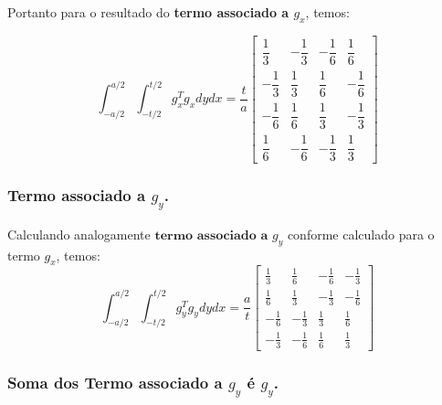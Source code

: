 \documentclass[
12pt,
a4paper,
oneside,
chapter=TITLE,
sumario=tradicional
]{abntex2}
\begin{document}
Portanto para o resultado do \textbf{termo associado a $g_x$}, temos:

\begin{equation}
	\int_{-a/2}^{a/2} \int_{-t/2}^{t/2} g_x^T g_x  dy dx
	=
	\frac{t}{a}  
	\begin{bmatrix}  
		\dfrac{1}{3} & -\dfrac{1}{3} & -\dfrac{1}{6} & \dfrac{1}{6} \\  
		-\dfrac{1}{3} & \dfrac{1}{3} & \dfrac{1}{6} & -\dfrac{1}{6} \\  
		-\dfrac{1}{6} & \dfrac{1}{6} & \dfrac{1}{3} & -\dfrac{1}{3} \\  
		\dfrac{1}{6} & -\dfrac{1}{6} & -\dfrac{1}{3} & \dfrac{1}{3}  
	\end{bmatrix} 
	\label{eq:MEF_eq_0041}  
\end{equation}



\subsubsection{Termo associado a $g_y$. }

Calculando analogamente $\textbf{termo associado a $g_y$}$ conforme calculado para o termo $g_x$, temos:
\begin{equation}
\int_{-a/2}^{a/2} \int_{-t/2}^{t/2} g_y^T g_y  dy dx
=
\frac{a}{t}  
\begin{bmatrix}  
	\frac{1}{3} & \frac{1}{6} & -\frac{1}{6} & -\frac{1}{3} \\  
	\frac{1}{6} & \frac{1}{3} & -\frac{1}{3} & -\frac{1}{6} \\  
	-\frac{1}{6} & -\frac{1}{3} & \frac{1}{3} & \frac{1}{6} \\  
	-\frac{1}{3} & -\frac{1}{6} & \frac{1}{6} & \frac{1}{3}  
	\end{bmatrix}   
	\label{eq:MEF_eq_0042}  
\end{equation}

\subsubsection{Soma dos Termo associado a $g_y$ é $g_y$. }
\end{document}
